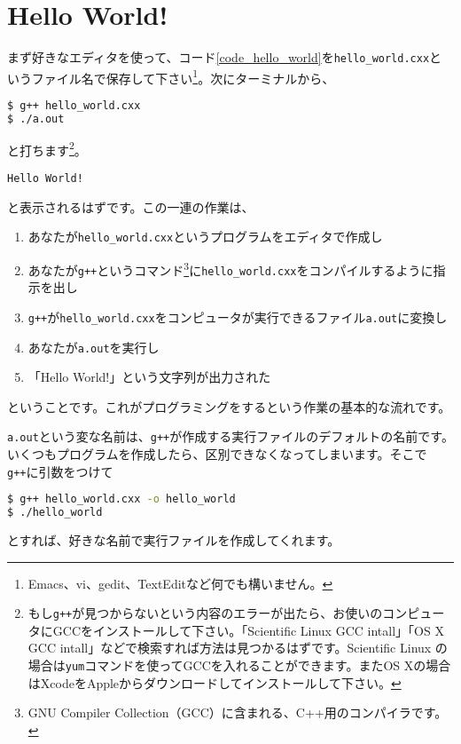 \section{Hello World!}

まず好きなエディタを使って、コード\ref{code_hello_world}を\texttt{hello\_world.cxx}というファイル名で保存して下さい\footnote{Emacs、vi、gedit、TextEditなど何でも構いません。}。次にターミナルから、
\begin{lstlisting}[language=bash]
$ g++ hello_world.cxx
$ ./a.out
\end{lstlisting}
と打ちます\footnote{もし\texttt{g++}が見つからないという内容のエラーが出たら、お使いのコンピュータにGCCをインストールして下さい。「Scientific Linux GCC intall」「OS X GCC intall」などで検索すれば方法は見つかるはずです。Scientific Linux の場合は\texttt{yum}コマンドを使ってGCCを入れることができます。またOS Xの場合はXcodeをAppleからダウンロードしてインストールして下さい。}。
\begin{lstlisting}
Hello World!
\end{lstlisting}
と表示されるはずです。この一連の作業は、
\begin{enumerate}
  \item あなたが\texttt{hello\_world.cxx}というプログラムをエディタで作成し
  \item あなたが\texttt{g++}というコマンド\footnote{GNU Compiler Collection（GCC）に含まれる、C++用のコンパイラです。}に\texttt{hello\_world.cxx}をコンパイルするように指示を出し
  \item \texttt{g++}が\texttt{hello\_world.cxx}をコンピュータが実行できるファイル\texttt{a.out}に変換し
  \item あなたが\texttt{a.out}を実行し
  \item 「Hello World!」という文字列が出力された
\end{enumerate}
ということです。これがプログラミングをするという作業の基本的な流れです。

\texttt{a.out}という変な名前は、\texttt{g++}が作成する実行ファイルのデフォルトの名前です。いくつもプログラムを作成したら、区別できなくなってしまいます。そこで\texttt{g++}に引数をつけて
\begin{lstlisting}[language=bash]
$ g++ hello_world.cxx -o hello_world
$ ./hello_world
\end{lstlisting}
とすれば、好きな名前で実行ファイルを作成してくれます。


